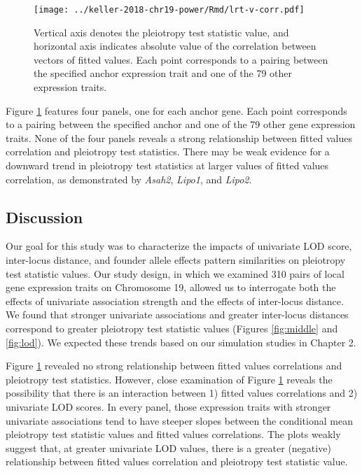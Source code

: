\documentclass[oneside]{book}\usepackage[]{graphicx}\usepackage[]{color}
\begin{document}

\begin{figure}
    \centering
    \texttt{[image: ../keller-2018-chr19-power/Rmd/lrt-v-corr.pdf]}
    \caption[Pleiotropy LRT vs. fitted values correlations plots reveal little evidence for a relationship.]{Vertical axis denotes the pleiotropy test statistic value, and horizontal axis indicates absolute value of the correlation between vectors of fitted values. Each point corresponds to a pairing between the specified anchor expression trait and one of the 79 other expression traits.}
    \label{fig:cor}
\end{figure}

Figure \ref{fig:cor} features four panels, one for each anchor gene. 
Each point corresponds to a pairing between the specified anchor and one of the 79 other gene expression traits. 
None of the four panels reveals a strong relationship between fitted values correlation and pleiotropy test statistics. 
There may be weak evidence for a downward trend in pleiotropy
test statistics at larger values of fitted values correlation, as 
demonstrated by \emph{Asah2}, \emph{Lipo1}, and \emph{Lipo2}. 



\subsection{Discussion}

Our goal for this study was to characterize the impacts of univariate LOD score, 
inter-locus distance, and founder allele effects pattern similarities on pleiotropy test
statistic values. 
Our study design, in which we examined 310 pairs of local gene expression traits on Chromosome
19, allowed us to interrogate both the effects of univariate association strength and the
effects of inter-locus distance. 
We found that stronger univariate associations and greater inter-locus distances
correspond to greater pleiotropy test statistic values (Figures \ref{fig:middle} 
and \ref{fig:lod}). 
We expected these trends based on our simulation studies in Chapter 2.

Figure \ref{fig:cor} revealed no strong relationship between fitted values 
correlations and pleiotropy test statistics. 
However, close examination of Figure \ref{fig:cor} reveals the possibility that there is an interaction between 1) fitted values correlations and 2) univariate LOD scores. 
In every panel, those expression traits with stronger univariate associations
tend to have steeper slopes between the conditional mean pleiotropy
test statistic values and fitted values correlations. 
The plots weakly suggest that, at greater univariate LOD values, 
there is a greater (negative) relationship between fitted values 
correlation and pleiotropy test statistic value.
\end{document}
